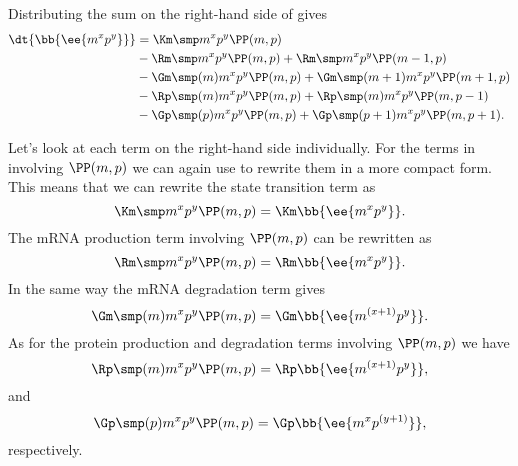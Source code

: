 Distributing the sum on the right-hand side of  gives
\begin{equation}
  \begin{aligned}
    \dt{\bb{\ee{m^x p^y}}} &=
    \Km \smp m^x p^y \PP(m, p)\\
    &- \Rm \smp m^x p^y \PP(m, p) + \Rm \smp m^x p^y \PP(m-1, p)\\
    &- \Gm \smp (m) m^x p^y \PP(m, p) + \Gm \smp (m + 1) m^x p^y \PP(m + 1, p)\\
    &- \Rp \smp (m) m^x p^y \PP(m, p) + \Rp \smp (m) m^x p^y \PP(m, p - 1)\\
    &- \Gp \smp (p) m^x p^y \PP(m, p) + \Gp \smp (p + 1) m^x p^y \PP(m, p + 1).
  \end{aligned}
  \label{seq_master_sum}
\end{equation}

Let's look at each term on the right-hand side individually. For the terms in
 involving $\PP(m, p)$ we can again use 
to rewrite them in a more compact form. This means that we can rewrite the
state transition term as
\begin{equation}
  \Km \smp m^x p^y \PP(m, p) = \Km \bb{\ee{m^x p^y}}.
\end{equation}
The mRNA production term involving $\PP(m, p)$ can be rewritten as
\begin{equation}
  \Rm \smp m^x p^y \PP(m, p) = \Rm \bb{\ee{m^x p^y}}.
\end{equation}
In the same way the mRNA degradation term gives
\begin{equation}
  \Gm \smp (m) m^x p^y \PP(m, p) = \Gm \bb{\ee{m^{(x + 1)} p^y}}.
\end{equation}
As for the protein production and degradation terms involving $\PP(m, p)$ we
have
\begin{equation}
  \Rp \smp (m) m^x p^y \PP(m, p) = \Rp \bb{\ee{m^{(x + 1)} p^y}},
\end{equation}
and
\begin{equation}
  \Gp \smp (p) m^x p^y \PP(m, p) = \Gp \bb{\ee{m^x p^{(y + 1)}}},
\end{equation}
respectively.

